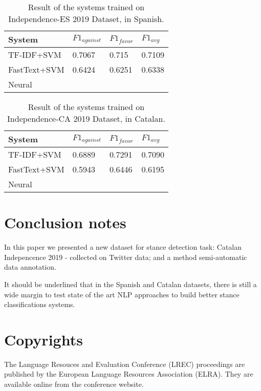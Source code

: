 \documentclass[10pt, a4paper]{article}
\begin{document}
\begin{table}[h]
\begin{tabularx}{\columnwidth}{|l|l|l|X|}
\hline
System       & $F1_{against}$ & $F1_{favor}$&$F1_{avg}$\\ \hline
TF-IDF+SVM   & 0.7067     & 0.715    & 0.7109 \\ \hline
FastText+SVM & 0.6424     & 0.6251   & 0.6338 \\ \hline
Neural       &            &          &        \\ \hline
\end{tabularx}
\caption{Result of the systems trained on Independence-ES 2019 Dataset, in Spanish. }
\label{tab:result_indep_es}
\end{table}

\begin{table}[h]
\begin{tabularx}{\columnwidth}{|l|l|l|X|}
\hline
System&$F1_{against}$&$F1_{favor}$&$F1_{avg}$ \\ \hline
TF-IDF+SVM&0.6889&0.7291&0.7090\\
\hline
FastText+SVM & 0.5943&0.6446&0.6195\\ 
\hline
Neural  &   &   & \\ 
\hline
\end{tabularx}
\caption{Result of the systems trained on Independence-CA 2019 Dataset, in Catalan.}
\label{tab:result_indep_ca}
\end{table}

\section{Conclusion notes}

In this paper we presented a new dataset for stance detection task: Catalan Indepencence 2019 - collected on Twitter data; and a method semi-automatic data annotation.  

It should be underlined that in the Spanish and Catalan datasets, there is still a wide margin to test state of the art NLP approaches to build better stance classifications systems.

\section{Copyrights}

The Language Resouces and Evaluation Conference (LREC)
proceedings are published by the European Language Resources Association (ELRA).
They are available online from the conference website.
\end{document}
